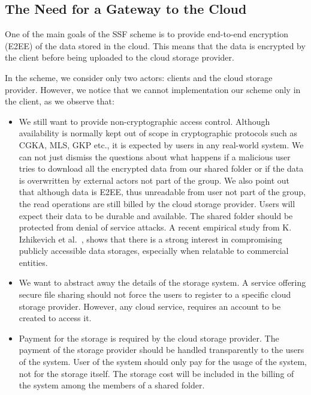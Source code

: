 \subsection{The Need for a Gateway to the Cloud}\label{sc:cloud-storage-access-and-billing}
One of the main goals of the SSF scheme is to provide
end-to-end encryption (E2EE) of the data stored in the cloud.
This means that the data is encrypted by the client before
being uploaded to the cloud storage provider.

In the scheme, we consider only two actors:
clients and the cloud storage provider.
However, we notice that we cannot implementation
our scheme only in the client, as we observe that:
\begin{itemize}
    \item We still want to provide non-cryptographic access control. 
    Although availability is normally kept out of scope in cryptographic 
    protocols such as CGKA, MLS, GKP etc., it is expected by users
    in any real-world system. We can not just dismiss the questions about
    what happens if a malicious user tries to download all the encrypted
    data from our shared folder or if the data is overwritten by external
    actors not part of the group. We also point out that although 
    data is E2EE, thus unreadable from user not part of the group,
    the read operations are still billed by the cloud storage provider.
    Users will expect their data to be durable
    and available. The shared folder should be protected from
    denial of service attacks. 
    A recent empirical study from K. Izhikevich et al.~\cite{izhikevich2023using},
    shows that there is a strong interest
    in compromising publicly accessible data storages,
    especially when relatable to commercial entities.
    \item We want to abstract away the details of the storage system.
    A service offering secure file sharing should not force the users
    to register to a specific cloud storage provider. However,
    any cloud service, requires an account to be created to access it.
    \item Payment for the storage is required by the cloud storage provider.
    The payment of the storage provider should be handled transparently
    to the users of the system. User of the system should only pay
    for the usage of the system, not for the storage itself. The storage
    cost will be included in the billing of the system among the members
    of a shared folder.
\end{itemize} 

